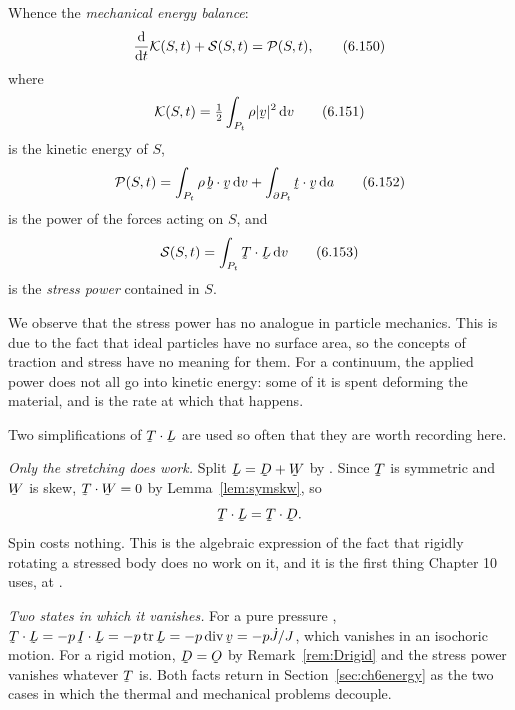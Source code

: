 
Whence the \emph{mechanical energy balance}:
\begin{equation}
   \frac{\mathrm{d}}{\mathrm{d} t}\mathcal{K}(S,t)+\mathcal{S}(S,t)
   =\mathcal{P}(S,t),
   \tag{6.150}\label{eq:6.150}
\end{equation}
where
\begin{equation}
   \mathcal{K}(S,t)=\tfrac12\int_{P_{t}}\rho|\bv|^{2}\,\dl v
   \tag{6.151}\label{eq:6.151}
\end{equation}
is the kinetic energy of $S$,
\begin{equation}
   \mathcal{P}(S,t)=\int_{P_{t}}\rho\,\ip\bb\bv\,\dl v
   +\int_{\partial P_{t}}\ip\bt\bv\,\dl a
   \tag{6.152}\label{eq:6.152}
\end{equation}
is the power of the forces acting on $S$, and
\begin{equation}
   \mathcal{S}(S,t)=\int_{P_{t}}\bT\cdot\bL\,\dl v
   \tag{6.153}\label{eq:6.153}
\end{equation}
is the \emph{stress power} contained in $S$.

We observe that the stress power has no analogue in particle mechanics.
This is due to the fact that ideal particles have no surface area, so
the concepts of traction and stress have no meaning for them. For a
continuum, the applied power  does not all go into kinetic
energy: some of it is spent deforming the material, and  is
the rate at which that happens.

\begin{remark}\label{rem:ch6stresspower}
Two simplifications of $\bT\cdot\bL$ are used so often that they are
worth recording here.

\emph{Only the stretching does work.} Split $\bL=\bD+\bW$ by .
Since $\bT$ is symmetric and $\bW$ is skew, $\bT\cdot\bW=0$ by
Lemma~\ref{lem:symskw}, so
\[
   \bT\cdot\bL=\bT\cdot\bD .
\]
Spin costs nothing. This is the algebraic expression of the fact that
rigidly rotating a stressed body does no work on it, and it is the
first thing Chapter 10 uses, at .

\emph{Two states in which it vanishes.} For a pure pressure
, $\bT\cdot\bL=-p\,\I\cdot\bL=-p\tr\bL=-p\dvg\bv
=-p\dot J/J$, which vanishes in an isochoric motion. For a rigid
motion, $\bD=\Ob$ by Remark~\ref{rem:Drigid} and the stress power
vanishes whatever $\bT$ is. Both facts return in
Section~\ref{sec:ch6energy} as the two cases in which the thermal and
mechanical problems decouple.
\end{remark}

